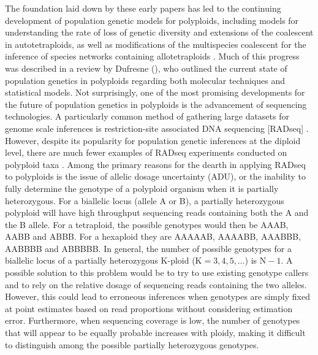 \documentclass[11pt,english,letterpaper,oneside]{article}
\begin{document}
The foundation laid down by these early papers has led to the continuing development of population genetic models for polyploids, including models for understanding the rate of loss of genetic diversity and extensions of the coalescent in autotetraploids, as well as modifications of the multispecies coalescent for the inference of species networks containing allotetraploids \citep{moody1993autopolyploids,arnold2012autotetraploidCoal,jones2013allopolyploid}. Much of this progress was described in a review by Dufresne \etal{} (\citeyear{dufresne2014polyPopGen}), who outlined the current state of population genetics in polyploids regarding both molecular techniques and statistical models. Not surprisingly, one of the most promising developments for the future of population genetics in polyploids is the advancement of sequencing technologies. A particularly common method of gathering large datasets for genome scale inferences is restriction-site associated DNA sequencing [RADseq] \citep{miller2007gbs,baird2008radTags,puritz2014demystifyingRAD}. However, despite its popularity for population genetic inferences at the diploid level, there are much fewer examples of RADseq experiments conducted on polyploid taxa \citep[but see][]{ogden2013sturgeonRADseq,wang2013birchRADseq,logan-young2015polyploidSNP}. Among the primary reasons for the dearth in applying RADseq to polyploids is the issue of allelic dosage uncertainty (ADU), or the inability to fully determine the genotype of a polyploid organism when it is partially heterozygous. For a biallelic locus (allele A or B), a partially heterozygous polyploid will have high throughput sequencing reads containing both the A and the B allele. For a tetraploid, the possible genotypes would then be AAAB, AABB and ABBB. For a hexaploid they are AAAAAB, AAAABB, AAABBB, AABBBB and ABBBBB. In general, the number of possible genotypes for a biallelic locus of a partially heterozygous K-ploid ($\text{K}=3,4,5,\ldots$) is $\text{N}-1$. A possible solution to this problem would be to try to use existing genotype callers and to rely on the relative dosage of sequencing reads containing the two alleles. However, this could lead to erroneous inferences when genotypes are simply fixed at point estimates based on read proportions without considering estimation error. Furthermore, when sequencing coverage is low, the number of genotypes that will appear to be equally probable increases with ploidy, making it difficult to distinguish among the possible partially heterozygous genotypes.
\medskip
\end{document}
